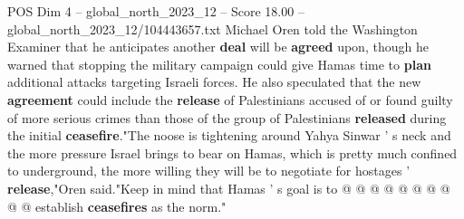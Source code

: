 \begin{textsample}{POS Dim 4 – global\_north\_2023\_12 – Score 18.00 – global\_north\_2023\_12/104443657.txt}
Michael Oren told the Washington Examiner that he anticipates another \textbf{deal} will be \textbf{agreed} upon, though he warned that stopping the military campaign could give Hamas time to \textbf{plan} additional attacks targeting Israeli forces.
He also speculated that the new \textbf{agreement} could include the \textbf{release} of Palestinians accused of or found guilty of more serious crimes than those of the group of Palestinians \textbf{released} during the initial \textbf{ceasefire}."The noose is tightening around Yahya Sinwar ' s neck and the more pressure Israel brings to bear on Hamas, which is pretty much confined to underground, the more willing they will be to negotiate for hostages ' \textbf{release},"Oren said."Keep in mind that Hamas ' s goal is to @ @ @ @ @ @ @ @ @ @ establish \textbf{ceasefires} as the norm."

\end{textsample}
